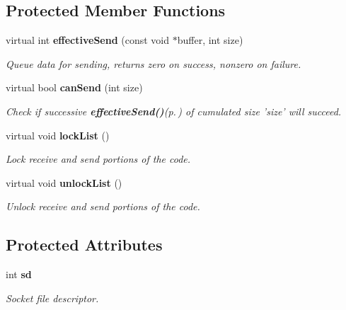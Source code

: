 \subsection*{Protected Member Functions}
\begin{CompactItemize}
\item 
virtual int {\bf effective\-Send} (const void $\ast$buffer, int size)\label{classUClient_b0}

\begin{CompactList}\small\item\em Queue data for sending, returns zero on success, nonzero on failure. \item\end{CompactList}\item 
virtual bool {\bf can\-Send} (int size)\label{classUClient_b1}

\begin{CompactList}\small\item\em Check if successive {\bf effective\-Send()}{\rm (p.\,\pageref{classUClient_b0})} of cumulated size 'size' will succeed. \item\end{CompactList}\item 
virtual void {\bf lock\-List} ()\label{classUClient_b2}

\begin{CompactList}\small\item\em Lock receive and send portions of the code. \item\end{CompactList}\item 
virtual void {\bf unlock\-List} ()\label{classUClient_b3}

\begin{CompactList}\small\item\em Unlock receive and send portions of the code. \item\end{CompactList}\end{CompactItemize}
\subsection*{Protected Attributes}
\begin{CompactItemize}
\item 
int {\bf sd}\label{classUClient_p0}

\begin{CompactList}\small\item\em Socket file descriptor. \item\end{CompactList}\end{CompactItemize}


